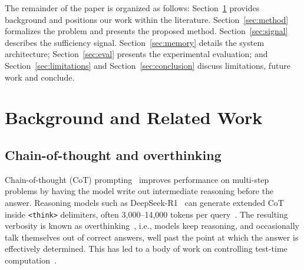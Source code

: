 \documentclass[review,12pt]{elsarticle}
\begin{document}
The remainder of the paper is organized as follows: Section~\ref{sec:related}
provides background and positions our work within the literature.
Section~\ref{sec:method} formalizes the problem and presents the proposed
method. Section~\ref{sec:signal} describes the sufficiency signal.
Section~\ref{sec:memory} details the system architecture;
Section~\ref{sec:eval} presents the experimental evaluation; and
Section~\ref{sec:limitations} and Section~\ref{sec:conclusion} discuss
limitations, future work and conclude. 




\section{Background and Related Work}
\label{sec:related}

\subsection{Chain-of-thought and overthinking}
Chain-of-thought (CoT) prompting~\cite{wei2022cot} improves performance on
multi-step problems by having the model write out intermediate reasoning
before the answer. Reasoning models such as
DeepSeek-R1~\cite{guo2025deepseekr1} can generate extended CoT
inside \texttt{<think>} delimiters, often 3{,}000--14{,}000 tokens per
query~\cite{tang2026laser}. The resulting verbosity is known as
overthinking~\cite{chen2024overthinking}, i.e., models keep reasoning, and
occasionally talk themselves out of correct answers, well past the point at
which the answer is effectively determined. This has led to
a body of work on controlling test-time
computation~\cite{snell2024testtime,xu2025chainofdraft,aggarwal2025l1}.
\end{document}
